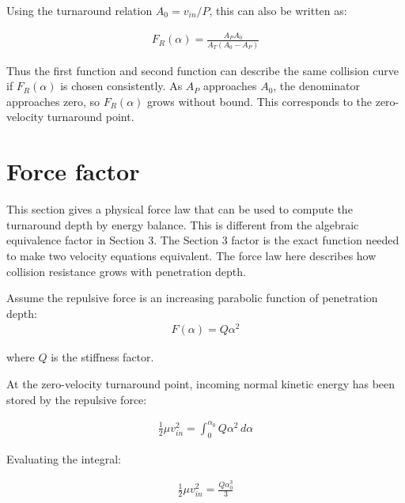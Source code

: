 Using the turnaround relation $A_0 = v_{in}/P$, this can also be written as:

\begin{equation}
\begin{aligned}
F_R(\alpha)
=
\frac{A_P A_0}
{A_T(A_0-A_P)}
\end{aligned}
\end{equation}

Thus the first function and second function can describe the same collision
curve if $F_R(\alpha)$ is chosen consistently.  As $A_P$ approaches $A_0$, the
denominator approaches zero, so $F_R(\alpha)$ grows without bound.  This
corresponds to the zero-velocity turnaround point.


\section{Force factor}


This section gives a physical force law that can be used to compute the
turnaround depth by energy balance.  This is different from the algebraic
equivalence factor in Section 3.  The Section 3 factor is the exact function
needed to make two velocity equations equivalent.  The force law here describes
how collision resistance grows with penetration depth.

Assume the repulsive force is an increasing parabolic function of penetration
depth:
\begin{equation}
\begin{aligned}
F(\alpha) = Q\alpha^2
\end{aligned}
\end{equation}

where $Q$ is the stiffness factor.

At the zero-velocity turnaround point, incoming normal kinetic energy has been
stored by the repulsive force:

\begin{equation}
\begin{aligned}
\frac{1}{2}\mu v_{in}^2
=
\int_0^{\alpha_0} Q\alpha^2\,d\alpha
\end{aligned}
\end{equation}

Evaluating the integral:

\begin{equation}
\begin{aligned}
\frac{1}{2}\mu v_{in}^2
=
\frac{Q\alpha_0^3}{3}
\end{aligned}
\end{equation}

